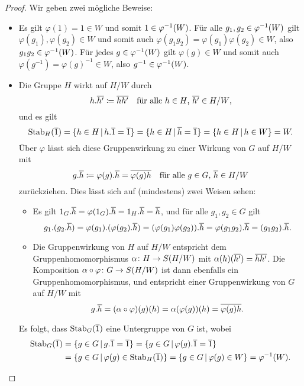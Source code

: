\begin{proof}
  Wir geben zwei mögliche Beweise:
  \begin{itemize}
    \item
      Es gilt $\varphi(1) = 1 \in W$ und somit $1 \in \varphi^{-1}(W)$.
      Für alle $g_1, g_2 \in \varphi^{-1}(W)$ gilt $\varphi(g_1), \varphi(g_2) \in W$ und somit auch $\varphi(g_1 g_2) = \varphi(g_1)\varphi(g_2) \in W$, also $g_1 g_2 \in \varphi^{-1}(W)$.
      Für jedes $g \in \varphi^{-1}(W)$ gilt $\varphi(g) \in W$ und somit auch $\varphi(g^{-1}) = \varphi(g)^{-1} \in W$, also $g^{-1} \in \varphi^{-1}(W)$.
    
    \item
      Die Gruppe $H$ wirkt auf $H/W$ durch
      \[
                  h.\overline{h'}
        \coloneqq \overline{hh'}
        \quad     \text{für alle $h \in H$, $\overline{h'} \in H/W$},
      \]
      und es gilt
      \[
          \stab{H}{\class{1}}
        = \{ h \in H \suchthat h.\class{1} = \class{1} \}
        = \{ h \in H \suchthat \class{h} = \class{1} \}
        = \{ h \in H \suchthat h \in W \}
        = W.
      \]
      Über $\varphi$ lässt sich diese Gruppenwirkung zu einer Wirkung von $G$ auf $H/W$ mit
      \[
                  g.\overline{h}
        \coloneqq \varphi(g).\overline{h}
        =         \overline{\varphi(g)h}
        \quad     \text{für alle $g \in G$, $\overline{h} \in H/W$}
      \]
      zurückziehen.
      Dies lässt sich auf (mindestens) zwei Weisen sehen:
      
      \begin{itemize}
        \item
          Es gilt $1_G.\overline{h} = \varphi(1_G).\overline{h} = 1_H.\overline{h} = \overline{h}$, und für alle $g_1, g_2 \in G$ gilt
          \[
              g_1.(g_2.\overline{h})
            = \varphi(g_1).(\varphi(g_2).\overline{h})
            = (\varphi(g_1) \varphi(g_2)).\overline{h}
            = \varphi(g_1 g_2).\overline{h}
            = (g_1 g_2).\overline{h}.
          \]
        \item
          Die Gruppenwirkung von $H$ auf $H/W$ entspricht dem Gruppenhomomorphismus $\alpha \colon H \to S(H/W)$ mit $\alpha(h)(\overline{h'}) = \overline{h h'}$.
          Die Komposition $\alpha \circ \varphi \colon G \to S(H/W)$ ist dann ebenfalls ein Gruppenhomomorphismus, und entspricht einer Gruppenwirkung von $G$ auf $H/W$ mit
          \[
              g.\overline{h}
            = (\alpha \circ \varphi)(g)(h)
            = \alpha(\varphi(g))(h)
            = \overline{\varphi(g) h}.
          \]
      \end{itemize}
      Es folgt, dass $\operatorname{Stab}_{G}(\overline{1})$ eine Untergruppe von $G$ ist, wobei
      \begin{align*}
            \stab{G}{\class{1}}
        &=  \{ g \in G \suchthat g.\class{1} = \class{1} \}
         =  \{ g \in G \suchthat \varphi(g).\class{1} = \class{1} \}
        \\
        &=  \{ g \in G \suchthat \varphi(g) \in \stab{H}{\class{1}} \}
         =  \{ g \in G \suchthat \varphi(g) \in W \}
         =  \preim{\varphi}{W}.
      \qedhere
      \end{align*}
    \qedhere
  \end{itemize}
\end{proof}

